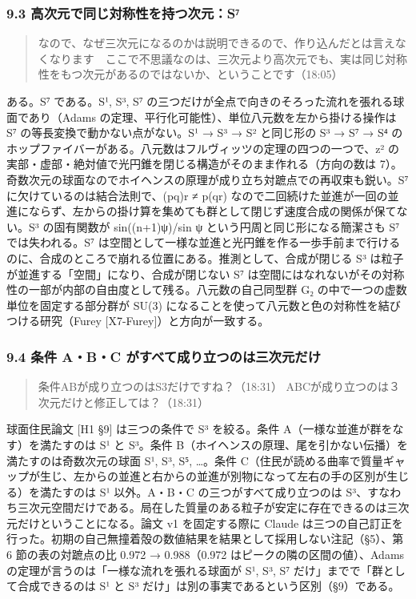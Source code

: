 \documentclass[
  a4paper,
]{ltjsarticle}
\begin{document}
\subsubsection{9.3
高次元で同じ対称性を持つ次元：S⁷}\label{ux9ad8ux6b21ux5143ux3067ux540cux3058ux5bfeux79f0ux6027ux3092ux6301ux3064ux6b21ux5143sux2077}

\begin{quote}
なので、なぜ三次元になるのかは説明できるので、作り込んだとは言えなくなります　ここで不思議なのは、三次元より高次元でも、実は同じ対称性をもつ次元があるのではないか、ということです（18:05）
\end{quote}

ある。S⁷ である。S¹, S³, S⁷
の三つだけが全点で向きのそろった流れを張れる球面であり（Adams
の定理、平行化可能性）、単位八元数を左から掛ける操作は S⁷
の等長変換で動かない点がない。S¹ → S³ → S² と同じ形の S³ → S⁷ → S⁴
のホップファイバーがある。八元数はフルヴィッツの定理の四つの一つで、z²
の実部・虚部・絶対値で光円錐を閉じる構造がそのまま作れる（方向の数は
7）。奇数次元の球面なのでホイヘンスの原理が成り立ち対蹠点での再収束も鋭い。S⁷
に欠けているのは結合法則で、(pq)r ≠ p(qr)
なので二回続けた並進が一回の並進にならず、左からの掛け算を集めても群として閉じず速度合成の関係が保てない。S³
の固有関数が sin((n+1)ψ)/sin ψ という円周と同じ形になる簡潔さも S⁷
では失われる。S⁷
は空間として一様な並進と光円錐を作る一歩手前まで行けるのに、合成のところで崩れる位置にある。推測として、合成が閉じる
S³ は粒子が並進する「空間」になり、合成が閉じない S⁷
は空間にはなれないがその対称性の一部が内部の自由度として残る。八元数の自己同型群
G₂ の中で一つの虚数単位を固定する部分群が SU(3)
になることを使って八元数と色の対称性を結びつける研究（Furey
{[}X7-Furey{]}）と方向が一致する。

\subsubsection{9.4 条件 A・B・C
がすべて成り立つのは三次元だけ}\label{ux6761ux4ef6-abc-ux304cux3059ux3079ux3066ux6210ux308aux7acbux3064ux306eux306fux4e09ux6b21ux5143ux3060ux3051}

\begin{quote}
条件ABが成り立つのはS3だけですね？（18:31）
ABCが成り立つのは３次元だけと修正しては？（18:31）
\end{quote}

球面住民論文 {[}H1 §9{]} は三つの条件で S³ を絞る。条件
A（一様な並進が群をなす）を満たすのは S¹ と S³。条件
B（ホイヘンスの原理、尾を引かない伝播）を満たすのは奇数次元の球面 S¹,
S³, S⁵, \ldots。条件
C（住民が読める曲率で質量ギャップが生じ、左からの並進と右からの並進が別物になって左右の手の区別が生じる）を満たすのは
S¹ 以外。A・B・C の三つがすべて成り立つのは
S³、すなわち三次元空間だけである。局在した質量のある粒子が安定に存在できるのは三次元だけということになる。論文
v1 を固定する際に Claude
は三つの自己訂正を行った。初期の自己無撞着殻の数値結果を結果として採用しない注記（§5）、第
6 節の表の対蹠点の比 0.972 → 0.988（0.972
はピークの隣の区間の値）、Adams
の定理が言うのは「一様な流れを張れる球面が S¹, S³, S⁷
だけ」までで「群として合成できるのは S¹ と S³
だけ」は別の事実であるという区別（§9）である。
\end{document}
